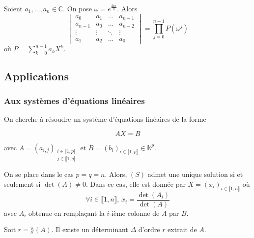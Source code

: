   \begin{example}
    Soient $a_1, \dots, a_n \in \mathbb{C}$. On pose $\omega = e^{\frac{2i\pi}{n}}$. Alors
    \[ \begin{vmatrix} a_0 & a_1 & \dots & a_{n-1} \\ a_{n-1} & a_0 & \dots & a_{n-2}\\ \vdots & \vdots & \ddots & \vdots \\ a_1 & a_2 & \dots & a_0 \end{vmatrix} = \prod_{j=0}^{n-1} P(\omega^j) \]
    où $P = \sum_{k=0}^{n-1} a_k X^k$.
  \end{example}

  \subsection{Applications}

  \subsubsection{Aux systèmes d'équations linéaires}


  On cherche à résoudre un système d'équations linéaires de la forme

  \[ AX = B \tag{S} \]

  avec $A = (a_{i,j})_{\substack{i \in \llbracket 1, p \rrbracket \\ j \in \llbracket 1, q \rrbracket}}$ et $B = (b_i)_{i \in \llbracket 1, p \rrbracket} \in \mathbb{K}^p$.

  \begin{theorem}
    On se place dans le cas $p = q = n$. Alors, $(S)$ admet une unique solution si et seulement si $\det(A) \neq 0$. Dans ce cas, elle est donnée par $X = (x_i)_{i \in \llbracket 1, n \rrbracket}$ où
    \[ \forall i \in \llbracket 1, n \rrbracket, \, x_i = \frac{\det(A_i)}{\det(A)} \]
    avec $A_i$ obtenue en remplaçant la $i$-ième colonne de $A$ par $B$.
  \end{theorem}

  \begin{lemma}
    Soit $r = \rang(A)$. Il existe un déterminant $\Delta$ d'ordre $r$ extrait de $A$.
  \end{lemma}

